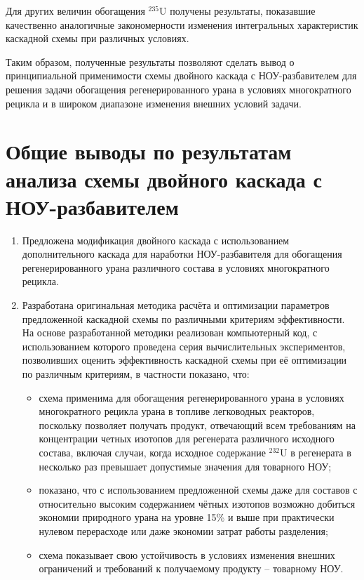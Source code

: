 Для других величин обогащения $^{235}$U получены результаты, показавшие качественно аналогичные закономерности изменения интегральных характеристик каскадной схемы при различных условиях. 

Таким образом, полученные результаты позволяют сделать вывод о принципиальной применимости схемы двойного каскада с НОУ-разбавителем для решения задачи обогащения регенерированного урана в условиях многократного рецикла и в широком диапазоне изменения внешних условий задачи.    


\section{Общие выводы по результатам анализа схемы двойного каскада с НОУ-разбавителем}

\begin{enumerate}
    \item Предложена модификация двойного каскада с использованием дополнительного каскада для наработки НОУ-разбавителя для обогащения регенерированного урана различного состава в условиях многократного рецикла.
    \item Разработана оригинальная методика расчёта и оптимизации параметров предложенной каскадной схемы по различными критериям эффективности. На основе разработанной методики реализован компьютерный код, с использованием которого проведена серия вычислительных экспериментов, позволивших оценить эффективность каскадной схемы при её оптимизации по различным критериям, в частности показано, что:
    \begin{itemize}
    \item схема применима для обогащения регенерированного урана в условиях многократного рецикла урана в топливе легководных реакторов, поскольку позволяет получать продукт, отвечающий всем требованиям на концентрации четных изотопов для регенерата различного исходного состава, включая случаи, когда исходное содержание $^{232}$U в регенерата в несколько раз превышает допустимые значения для товарного НОУ;
    \item показано, что с использованием предложенной схемы даже для составов с относительно высоким содержанием чётных изотопов возможно добиться экономии природного урана на уровне 15\% и выше при практически нулевом перерасходе или даже экономии затрат работы разделения;
    \item схема показывает свою устойчивость в условиях изменения внешних ограничений и требований к получаемому продукту -- товарному НОУ. 
    \end{itemize}       

\end{enumerate}
